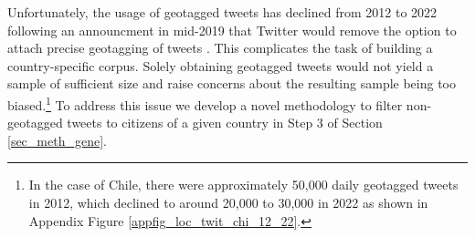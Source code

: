         \newline\indent
    Unfortunately, the usage of geotagged tweets has declined from 2012 to 2022 following an announcment in mid-2019 that Twitter would remove the option to attach precise geotagging of tweets \citep{kruspe_changes_2021}. This complicates the task of building a country-specific corpus. Solely obtaining geotagged tweets would not yield a sample of sufficient size and raise concerns about the resulting sample being too biased.\footnote{In the case of Chile, there were approximately 50,000 daily geotagged tweets in 2012, which declined to around 20,000 to 30,000 in 2022 as shown in Appendix Figure \ref{appfig_loc_twit_chi_12_22}.} To address this issue we develop a novel methodology to filter non-geotagged tweets to citizens of a given country in Step 3 of Section \ref{sec_meth_gene}.
        
        

